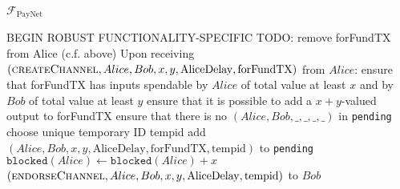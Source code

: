 \begin{functionality}{$\mathcal{F}_{\mathrm{PayNet}}$}
\begin{algorithmic}[1]
    \State BEGIN ROBUST FUNCTIONALITY-SPECIFIC
    \State TODO: remove forFundTX from Alice (c.f. above)
    \State Upon receiving $\left(\textsc{createChannel}, Alice, Bob, x, y,
    \mathrm{AliceDelay}, \mathrm{forFundTX}\right)$ from $Alice$:
    \Indent
      \State ensure that forFundTX has inputs spendable by $Alice$ of total
      value at least $x$ and by $Bob$ of total value at least $y$
      \State ensure that it is possible to add a $x + y$-valued output to
      forFundTX
      \State ensure that there is no $\left(Alice, Bob, \_, \_, \_, \_\right)$
      in \texttt{pending}
      \State choose unique temporary ID tempid
      \State add $\left(Alice, Bob, x, y, \mathrm{AliceDelay},
      \mathrm{forFundTX}, \mathrm{tempid}\right)$ to \texttt{pending}
      \State $\mathtt{blocked}\left(Alice\right) \leftarrow
      \mathtt{blocked}\left(Alice\right) + x$
      \State \Return $\left(\textsc{endorseChannel}, Alice, Bob, x, y,
      \mathrm{AliceDelay}, \mathrm{tempid}\right)$ to $Bob$ 
    \EndIndent
    \State


\end{algorithmic}
\end{functionality}
